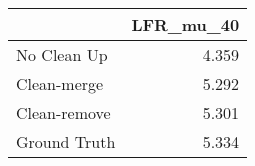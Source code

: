 \begin{tabular}{lr}
\toprule
{} & LFR_mu_40 \\
\midrule
No Clean Up  &     4.359 \\
Clean-merge  &     5.292 \\
Clean-remove &     5.301 \\
Ground Truth &     5.334 \\
\bottomrule
\end{tabular}
